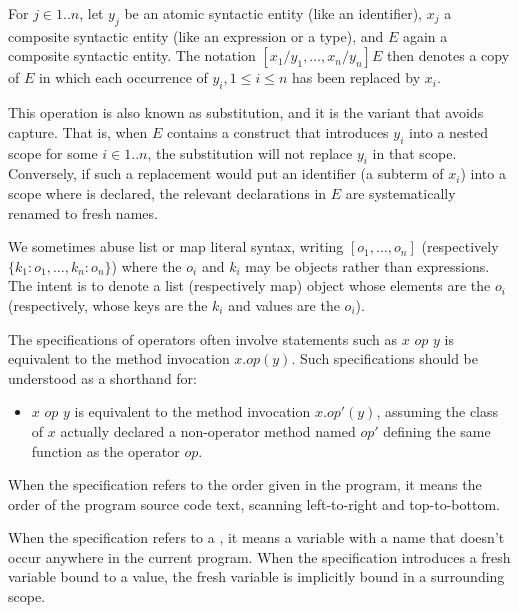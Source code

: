 \documentclass[makeidx]{article}
\begin{document}
\LMHash{}%
For $j \in 1 .. n$,
let $y_j$ be an atomic syntactic entity (like an identifier),
$x_j$ a composite syntactic entity (like an expression or a type),
and $E$ again a composite syntactic entity.
The notation $[x_1/y_1, \ldots, x_n/y_n]E$ then denotes a copy of $E$
in which each occurrence of $y_i, 1 \le i \le n$ has been replaced by $x_i$.

\LMHash{}%
This operation is also known as substitution, and it is the variant that avoids capture.
That is, when $E$ contains a construct that introduces $y_i$ into a nested scope for some $i \in 1 .. n$,
the substitution will not replace $y_i$ in that scope.
Conversely, if such a replacement would put an identifier \id{} (a subterm of $x_i$) into a scope where \id{} is declared,
the relevant declarations in $E$ are systematically renamed to fresh names.


\LMHash{}%
We sometimes abuse list or map literal syntax, writing $[o_1, \ldots, o_n]$ (respectively $\{k_1: o_1, \ldots, k_n: o_n\}$) where the $o_i$ and $k_i$ may be objects rather than expressions.
The intent is to denote a list (respectively map) object whose elements are the $o_i$ (respectively, whose keys are the $k_i$ and values are the $o_i$).

\LMHash{}%
The specifications of operators often involve statements such as $x$ $op$ $y$ is equivalent to the method invocation $x.op(y)$.
Such specifications should be understood as a shorthand for:
\begin{itemize}
\item
$x$ $op$ $y$ is equivalent to the method invocation $x.op'(y)$, assuming the class of $x$ actually declared a non-operator method named $op'$ defining the same function as the operator $op$.
\end{itemize}


\LMHash{}%
When the specification refers to the order given in the program, it means the order of the program source code text, scanning left-to-right and top-to-bottom.

\LMHash{}%
When the specification refers to a
,
it means a variable with a name that doesn't occur anywhere
in the current program.
When the specification introduces a fresh variable bound to a value, the fresh variable is implicitly bound in a surrounding scope.
\end{document}
